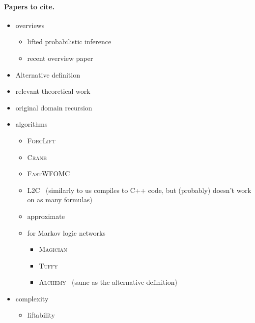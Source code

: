 \documentclass{article}
\theoremstyle{definition}
\begin{document}
\paragraph{Papers to cite.}
\begin{itemize}
  \item overviews
        \begin{itemize}
          \item lifted probabilistic inference~\cite{DBLP:conf/ecai/Kersting12}
          \item recent overview paper~\cite{DBLP:conf/ijcai/Kuzelka23}
        \end{itemize}
  \item Alternative definition~\cite{DBLP:journals/cacm/GogateD16}
  \item relevant theoretical work~\cite{DBLP:conf/aaai/MalhotraS22}
  \item original domain recursion~\cite{DBLP:conf/nips/Broeck11}
  \item algorithms
        \begin{itemize}
          \item \textsc{ForcLift}~\cite{DBLP:conf/ijcai/BroeckTMDR11}
          \item \textsc{Crane}~\cite{DBLP:conf/kr/DilkasB23}
          \item \textsc{FastWFOMC}~\cite{DBLP:conf/uai/BremenK21}
          \item \textsc{L2C}~\cite{DBLP:conf/kr/KazemiP16} (similarly to us
                compiles to C++ code, but (probably) doesn't work on as many
                formulas)
          \item approximate~\cite{DBLP:conf/ijcai/BremenK20}
          \item for Markov logic networks~\cite{DBLP:journals/ml/RichardsonD06}
                \begin{itemize}
                  \item \textsc{Magician}~\cite{DBLP:conf/aaai/VenugopalSG15}
                  \item \textsc{Tuffy}~\cite{DBLP:journals/pvldb/NiuRDS11}
                  \item \textsc{Alchemy}~\cite{DBLP:journals/cacm/GogateD16}
                        (same as the alternative definition)
                \end{itemize}
        \end{itemize}
  \item complexity
        \begin{itemize}
          \item liftability~\cite{DBLP:conf/starai/JaegerB12}

\end{itemize}
\end{itemize}
\end{document}
